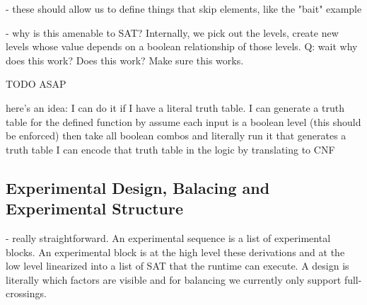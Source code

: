 - these should allow us to define things that skip elements, like the "bait" example

- why is this amenable to SAT? Internally, we pick out the levels, create new levels whose value depends on a boolean relationship of those levels. Q: wait why does this work? Does this work? Make sure this works.

TODO ASAP

here's an idea: I can do it if I have a literal truth table.
I can generate a truth table for the defined function by
assume each input is a boolean level (this should be enforced)
then take all boolean combos and literally run it
that generates a truth table
I can encode that truth table in the logic by translating to CNF

\subsection{Experimental Design, Balacing and Experimental Structure}

- really straightforward. An experimental sequence is a list of experimental blocks. An experimental block is at the high level these derivations and at the low level linearized into a list of SAT that the runtime can execute. A design is literally which factors are visible and for balancing we currently only support full-crossings.
